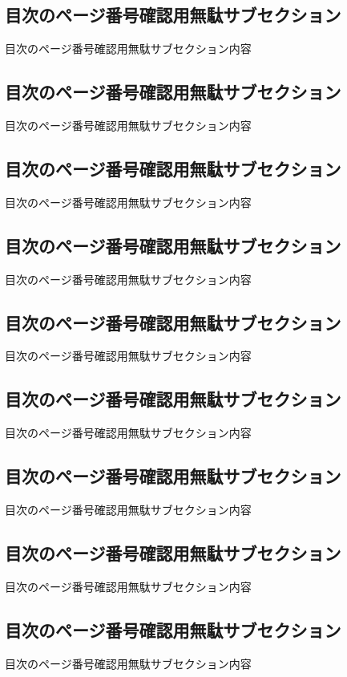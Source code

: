\subsection{目次のページ番号確認用無駄サブセクション}
目次のページ番号確認用無駄サブセクション内容

\subsection{目次のページ番号確認用無駄サブセクション}
目次のページ番号確認用無駄サブセクション内容

\subsection{目次のページ番号確認用無駄サブセクション}
目次のページ番号確認用無駄サブセクション内容

\subsection{目次のページ番号確認用無駄サブセクション}
目次のページ番号確認用無駄サブセクション内容

\subsection{目次のページ番号確認用無駄サブセクション}
目次のページ番号確認用無駄サブセクション内容

\subsection{目次のページ番号確認用無駄サブセクション}
目次のページ番号確認用無駄サブセクション内容

\subsection{目次のページ番号確認用無駄サブセクション}
目次のページ番号確認用無駄サブセクション内容

\subsection{目次のページ番号確認用無駄サブセクション}
目次のページ番号確認用無駄サブセクション内容

\subsection{目次のページ番号確認用無駄サブセクション}
目次のページ番号確認用無駄サブセクション内容


